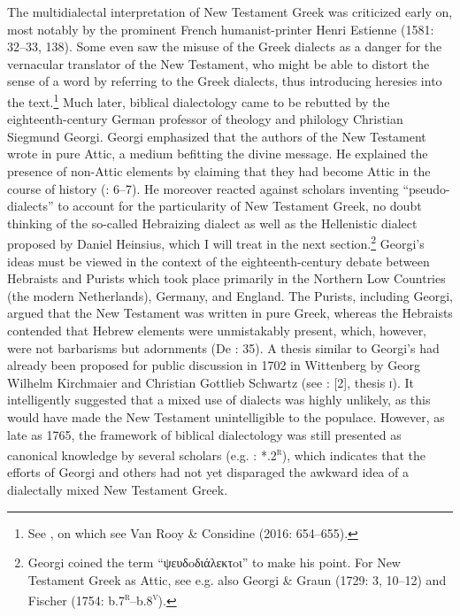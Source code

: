 The multidialectal interpretation of New Testament Greek was criticized early on, most notably by the prominent French humanist-printer Henri Estienne (1581: 32–33, 138). Some even saw the misuse of the Greek dialects as a danger for the vernacular translator of the New Testament, who might be able to distort the sense of a word by referring to the Greek dialects, thus introducing heresies into the text.\footnote{See \citet[429]{Rainolds1583}, on which see Van Rooy \& Considine (2016: 654–655).} Much later, biblical dialectology came to be rebutted by the eighteenth-century German professor of theology and philology Christian Siegmund Georgi. Georgi emphasized that the authors of the New Testament wrote in pure Attic, a medium befitting the divine message. He explained the presence of non-Attic elements by claiming that they had become Attic in the course of history (\citealt{Georgi1733}: 6–7). He moreover reacted against scholars inventing “pseudo-dialects” to account for the particularity of New Testament Greek, no doubt thinking of the so-called Hebraizing dialect as well as the Hellenistic dialect proposed by Daniel Heinsius, which I will treat in the next section.\footnote{Georgi coined the term “ψευδoδιάλεκτoι” to make his point. For New Testament Greek as Attic, see e.g. also Georgi \& Graun (1729: 3, 10–12) and Fischer (1754: b.7\textsc{\textsuperscript{r}}–b.8\textsc{\textsuperscript{v}}).} Georgi’s ideas must be viewed in the context of the eighteenth-century debate between Hebraists and Purists which took place primarily in the Northern Low Countries (the modern Netherlands), Germany, and England. The Purists, including Georgi, argued that the New Testament was written in pure Greek, whereas the Hebraists contended that Hebrew elements were unmistakably present, which, however, were not barbarisms but adornments (De \citealt{Jonge1980}: 35). A thesis similar to Georgi’s had already been proposed for public discussion in 1702 in Wittenberg by Georg Wilhelm Kirchmaier and Christian Gottlieb Schwartz (see \citealt{KirchmaierSchwartz1702}: [2], thesis \textsc{i}). It intelligently suggested that a mixed use of dialects was highly unlikely, as this would have made the New Testament unintelligible to the populace. However, as late as 1765, the framework of biblical dialectology was still presented as canonical knowledge by several scholars (e.g. \citealt{Gottleber1765}: *.2\textsc{\textsuperscript{r}}), which indicates that the efforts of Georgi and others had not yet disparaged the awkward idea of a dialectally mixed New Testament Greek.


